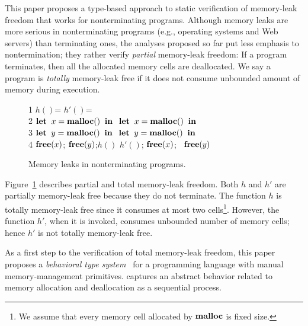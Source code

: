 This paper proposes a type-based approach to static verification of
memory-leak freedom that works for nonterminating programs.  Although
memory leaks are more serious in nonterminating programs (e.g.,
operating systems and Web servers) than terminating ones, the analyses
proposed so far put less emphasis to nontermination; they rather
verify \emph{partial} memory-leak freedom: If a program terminates,
then all the allocated memory cells are deallocated.  We say a program
is \emph{totally} memory-leak free if it does not consume unbounded
amount of memory during execution.


\begin{exmp}\label{ex:ex1}
\begin{figure}[h]
1  \Rtab $h()$= \dtb \dtb\dtb\Rtab$h'()$= \\
2  \dtb $\mathbf{let}\; \; x = \mathbf{malloc()}\;  \; \mathbf{in}\;$ \dtb \Rtab$\mathbf{let}\; \; x = \mathbf{malloc()}\;  \; \mathbf{in}\;$\\
3  \dtb $\mathbf{let}\; \; y = \mathbf{malloc()}\;  \; \mathbf{in}\;$ \dtb \Rtab$\mathbf{let}\; \; y = \mathbf{malloc()}\;  \; \mathbf{in}\;$\\
4  \dtb $\mathbf{free}(x)$; $\mathbf{free}(y) $;\;$h()$ \dtb \Rtab$h'()$; $\mathbf{free}(x)$; \ $\mathbf{free}(y)$
\caption{Memory leaks in nonterminating programs.}
\label{ex:np}
\end{figure}
Figure~\ref{ex:np} describes partial and total memory-leak freedom.
Both \(h\) and \(h'\) are partially memory-leak free because they do
not terminate.  The function \(h\) is totally memory-leak free since
it consumes at most two cells\footnote{We assume that every memory
  cell allocated by \(\mathbf{malloc}\) is fixed size.}.  However, the
function \(h'\), when it is invoked, consumes unbounded number of
memory cells; hence \(h'\) is not totally memory-leak free.
\end{exmp}

As a first step to the verification of total memory-leak freedom, this
paper proposes a \emph{behavioral type
  system}~\cite{DBLP:journals/lmcs/KobayashiSW06,DBLP:journals/tcs/IgarashiK04,DBLP:conf/esop/HondaVK98}
for a programming language with manual memory-management primitives.
captures an abstract behavior related to memory allocation and
deallocation as a sequential process.


